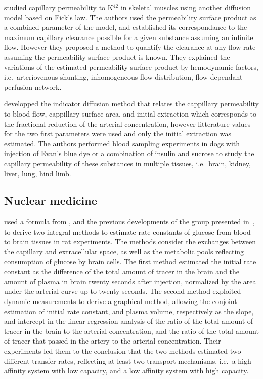 \citet{Renkin:1959te} studied capillary permeability to K$^{42}$ in skeletal muscles using another diffusion model based on Fick's law.
The authors used the permeability surface product as a combined parameter of the model, and established its correspondance to the maximum capillary clearance possible for a given substance assuming an infinite flow.
However they proposed a method to quantify the clearance at any flow rate assuming the permeability surface product is known.
They explained the variations of the estimated permeability surface product by hemodynamic factors, i.e.~arteriovenous shunting, inhomogeneous flow distribution, flow-dependant perfusion network.

\citet{Crone:1963cz} developped the indicator diffusion method that relates the cappillary permeability to blood flow, cappillary surface area, and initial extraction which corresponds to the fractional reduction of the arterial concentration, however litterature values for the two first parameters were used and only the initial extraction was estimated.
The authors performed blood sampling experiments in dogs with injection of Evan's blue dye or a combination of insulin and sucrose to study the capillary permeability of these substances in multiple tissues, i.e.~brain, kidney, liver, lung, hind limb.

\subsection{Nuclear medicine}

\citet{Gjedde:1981ge} used a formula from \citet{Crone:1963cz}, and the previous developments of the group presented in~\cite{Gjedde:1980kh}, to derive two integral methods to estimate rate constants of glucose from blood to brain tissues in rat experiments.
The methods consider the exchanges between the capillary and extracellular space, as well as the metabolic pools reflecting consumption of glucose by brain cells.
The first method estimated the initial rate constant as the difference of the total amount of tracer in the brain and the amount of plasma in brain twenty seconds after injection, normalized by the area under the arterial curve up to twenty seconds.
The second method exploited dynamic measurements to derive a graphical method, allowing the conjoint estimation of initial rate constant, and plasma volume, respectively as the slope, and intercept in the linear regression analysis of the ratio of the total amount of tracer in the brain to the arterial concentration, and the ratio of the total amount of tracer that passed in the artery to the arterial concentration.
Their experiments led them to the conclusion that the two methods estimated two different transfer rates, reflecting at least two transport mechanisms, i.e.~a high affinity system with low capacity, and a low affinity system with high capacity.

